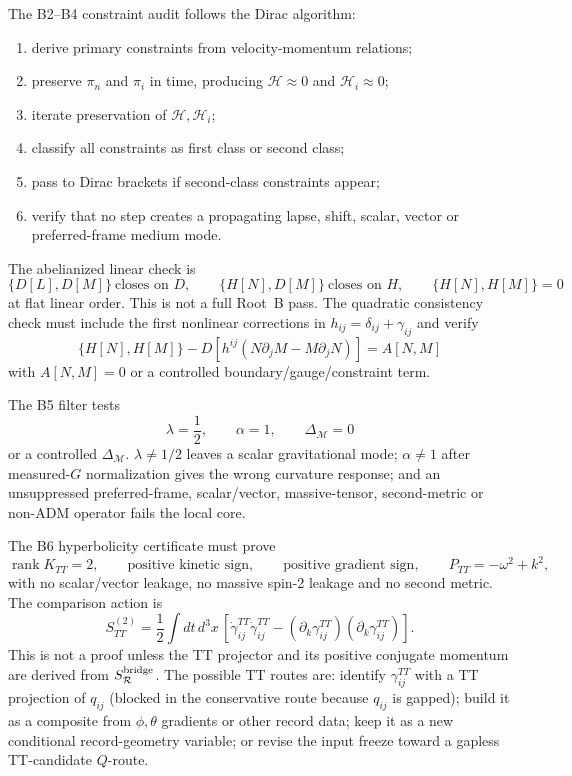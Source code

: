 \documentclass[11pt]{article}
\begin{document}
The B2--B4 constraint audit follows the Dirac algorithm:
\begin{enumerate}
\item derive primary constraints from velocity-momentum relations;
\item preserve \(\pi_n\) and \(\pi_i\) in time, producing
  \(\mathcal H\approx0\) and \(\mathcal H_i\approx0\);
\item iterate preservation of \(\mathcal H,\mathcal H_i\);
\item classify all constraints as first class or second class;
\item pass to Dirac brackets if second-class constraints appear;
\item verify that no step creates a propagating lapse, shift, scalar, vector
  or preferred-frame medium mode.
\end{enumerate}
The abelianized linear check is
\[
\boxed{
\{D[L],D[M]\}\ \text{closes on }D,\qquad
\{H[N],D[M]\}\ \text{closes on }H,\qquad
\{H[N],H[M]\}=0
}
\]
at flat linear order.  This is not a full Root~B pass.  The quadratic
consistency check must include the first nonlinear corrections in
\(h_{ij}=\delta_{ij}+\gamma_{ij}\) and verify
\[
\boxed{
\{H[N],H[M]\}
-D[h^{ij}(N\partial_jM-M\partial_jN)]
=A[N,M]
}
\]
with \(A[N,M]=0\) or a controlled boundary/gauge/constraint term.

The B5 filter tests
\[
\boxed{\lambda=\frac12,\qquad \alpha=1,\qquad \Delta_{\mathcal M}=0}
\]
or a controlled \(\Delta_{\mathcal M}\).  \(\lambda\ne1/2\) leaves a scalar
gravitational mode; \(\alpha\ne1\) after measured-\(G\) normalization gives
the wrong curvature response; and an unsuppressed preferred-frame,
scalar/vector, massive-tensor, second-metric or non-ADM operator fails the
local core.

The B6 hyperbolicity certificate must prove
\[
\boxed{
\operatorname{rank}K_{TT}=2,\qquad
\text{positive kinetic sign},\qquad
\text{positive gradient sign},\qquad
P_{TT}=-\omega^2+k^2,
}
\]
with no scalar/vector leakage, no massive spin-2 leakage and no second
metric.  The comparison action is
\[
\boxed{
S_{TT}^{(2)}
=\frac12\int dt\,d^3x\,
\left[
\dot\gamma_{ij}^{TT}\dot\gamma_{ij}^{TT}
-(\partial_k\gamma_{ij}^{TT})(\partial_k\gamma_{ij}^{TT})
\right].
}
\]
This is not a proof unless the TT projector and its positive conjugate
momentum are derived from \(S_{\mathcal R}^{\rm bridge}\).  The possible TT
routes are: identify \(\gamma_{ij}^{TT}\) with a TT projection of \(q_{ij}\)
(blocked in the conservative route because \(q_{ij}\) is gapped); build it as
a composite from \(\phi,\theta\) gradients or other record data; keep it as a
new conditional record-geometry variable; or revise the input freeze toward a
gapless TT-candidate \(Q\)-route.
\end{document}
